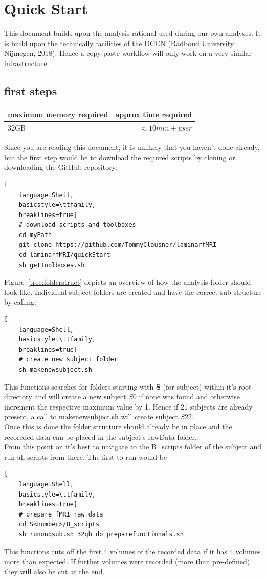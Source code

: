 \documentclass[12pt,a4paper]{scrartcl}
\begin{document}
\FloatBarrier

\section{Quick Start}
This document builds upon the analysis rational used during our own analyses. It is build upon the technically facilities of the DCCN (Radboud University Nijmegen, 2018). Hence a copy-paste workflow will only work on a very similar infrastructure.\\
\subsection{first steps}
\begin{table}[h]
\begin{tabular}{l | r}
\toprule
maximum memory required & approx time required\\\toprule
32GB & $\approx 10min+user$ \\\bottomrule
\end{tabular}
\end{table}
\FloatBarrier
\noindent Since you are reading this document, it is unlikely that you haven't done already, but the first step would be to download the required scripts by cloning or downloading the GitHub repository:
\begin{lstlisting}[
    language=Shell,
    basicstyle=\ttfamily,
    breaklines=true]
    # download scripts and toolboxes
    cd myPath
    git clone https://github.com/TommyClausner/laminarfMRI
    cd laminarfMRI/quickStart
    sh getToolboxes.sh
\end{lstlisting}
Figure~\ref{tree:folderstruct} depicts an overview of how the analysis folder should look like. Individual subject folders are created and have the correct sub-structure by calling:
\begin{lstlisting}[
    language=Shell,
    basicstyle=\ttfamily,
    breaklines=true]
    # create new subject folder
    sh makenewsubject.sh
 \end{lstlisting}
This functions searches for folders starting with \textbf{S} (for subject) within it's root directory and will create a new subject $S0$ if none was found and otherwise increment the respective maximum value by 1. Hence if 21 subjects are already present, a call to makenewsubject.sh will create subject $S22$.\\
Once this is done the folder structure should already be in place and the recoreded data can be placed in the subject's rawData folder.\\
From this point on it's best to navigate to the B\_scripts folder of the subject and run all scripts from there. The first to run would be
\begin{lstlisting}[
    language=Shell,
    basicstyle=\ttfamily,
    breaklines=true]
    # prepare fMRI raw data
    cd S<number>/B_scripts
    sh runonqsub.sh 32gb do_preparefunctionals.sh
\end{lstlisting}
This functions cuts off the first 4 volumes of the recorded data if it has 4 volumes more than expected. If further volumes were recorded (more than pre-defined) they will also be cut at the end.
\end{document}
